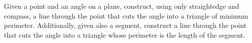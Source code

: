 Given a point and an angle on a plane,
construct, using only straightedge and compass,
a line through the point
that cuts the angle into a triangle of minimum perimeter.\newline
Additionally, given also a segment, construct a line through the point
that cuts the angle into a triangle whose perimeter is the length of the segment.
